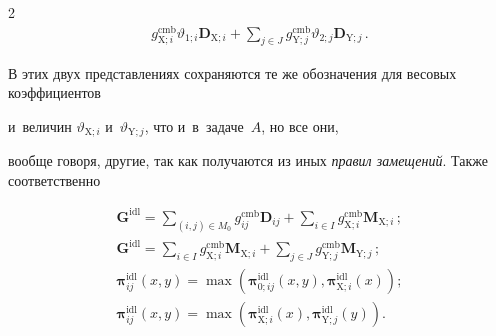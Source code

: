 \begin{multicols}{2}
\begin{align*}
g_{\mathrm{X};i}^{\mathrm{cmb}}\vartheta_{1;i}\boldsymbol{D}_{\mathrm{X};i} + 


\sum\limits_{j\in J} g^{\mathrm{cmb}}_{\mathrm{Y};j}\vartheta_{2;j} 


\boldsymbol{D}_{\mathrm{Y};j}\,.


  \end{align*}




   В этих двух представлениях сохраняются те же обозначения для весовых коэффициентов 


   и~величин $\vartheta_{\mathrm{X};i}$ и~$\vartheta_{\mathrm{Y};j}$, что и~в~задаче~$A$, но все они, 


вообще говоря, другие, так как получаются из иных \textit{правил замещений}. Также соответственно 





\noindent


  \begin{equation}


  \left.


  \begin{array}{l}


  \boldsymbol{G}^{\mathrm{idl}}=\displaystyle\sum\limits_{(i,j)\in M_0} 


g_{ij}^{\mathrm{cmb}}\boldsymbol{D}_{ij} +


\displaystyle\sum\limits_{i\in I} g^{\mathrm{cmb}}_{\mathrm{X};i} 


\boldsymbol{M}_{\mathrm{X};i}\,;\\[12pt]


  \boldsymbol{G}^{\mathrm{idl}}=\displaystyle \sum\limits_{i\in I} 


g_{\mathrm{X};i}^{\mathrm{cmb}}\boldsymbol{M}_{\mathrm{X};i} +\sum\limits_{j\in J} 


g^{\mathrm{cmb}}_{\mathrm{Y};j} \boldsymbol{M}_{\mathrm{Y};j}\,;\\[12pt]


  \boldsymbol{\pi}_{ij}^{\mathrm{idl}}(x,y)=\max\left( \boldsymbol{\pi}_{0;ij}^{\mathrm{idl}} (x,y), 


\boldsymbol{\pi}^{\mathrm{idl}}_{\mathrm{X};i}(x)\right);\\[9pt]


  \boldsymbol{\pi}_{ij}^{\mathrm{idl}}(x,y)=\max\left( 


\boldsymbol{\pi}_{\mathrm{X};i}^{\mathrm{idl}} (x), 


\boldsymbol{\pi}^{\mathrm{idl}}_{\mathrm{Y};j}(y)\right).



\end{array}
\end{equation}
\end{multicols}

